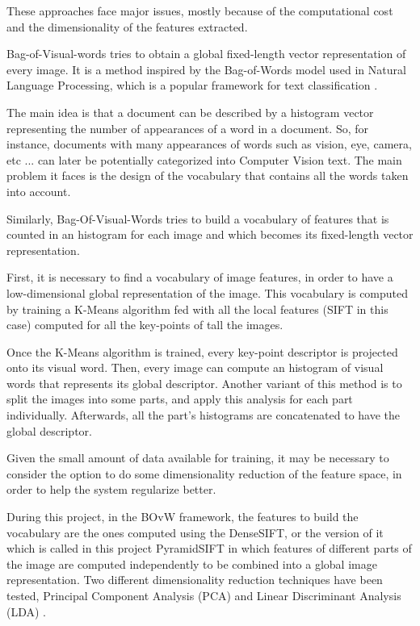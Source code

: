\documentclass[runningheads]{llncs}
\begin{document}
These approaches face major issues, mostly because of the computational cost and the dimensionality of the features extracted.

Bag-of-Visual-words tries to obtain a global fixed-length vector representation of every image. It is a method inspired by the Bag-of-Words model used in Natural Language Processing, which is a popular framework for text classification \cite{article}.

The main idea is that a document can be described by a histogram vector representing the number of appearances of a word in a document. So, for instance, documents with many appearances of words such as vision, eye, camera, etc ... can later be potentially categorized into Computer Vision text. The main problem it faces is the design of the vocabulary that contains all the words taken into account.

Similarly, Bag-Of-Visual-Words tries to build a vocabulary of features that is counted in an histogram for each image and which becomes its fixed-length vector representation.

First, it is necessary to find a vocabulary of image features, in order to have a low-dimensional global representation of the image. This vocabulary is computed by training a K-Means algorithm fed with all the local features (SIFT in this case) computed for all the key-points of tall the images.

Once the K-Means algorithm is trained, every key-point descriptor is projected onto its visual word. Then, every image can compute an histogram of visual words that represents its global descriptor.
Another variant of this method is to split the images into some parts, and apply this analysis for each part individually. Afterwards, all the part's histograms are concatenated to have the global descriptor.


Given the small amount of data available for training, it may be necessary to consider the option to do some dimensionality reduction of the feature space, in order to help the system regularize better.

During this project, in the BOvW framework, the features to build the vocabulary are the ones computed using the DenseSIFT, or the version of it which is called in this project PyramidSIFT in which features of different parts of the image are computed independently to be combined into a global image representation. Two different dimensionality reduction techniques have been tested, Principal Component Analysis (PCA) and Linear Discriminant Analysis (LDA) \cite{6920716}.
\end{document}
